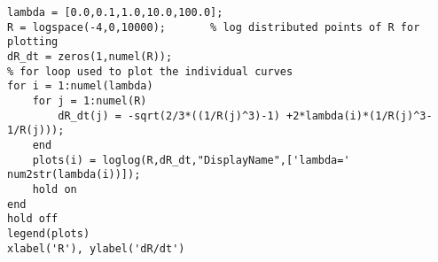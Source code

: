 \lstset{basicstyle=\footnotesize,style=myCustomMatlabStyle}
\begin{lstlisting}
lambda = [0.0,0.1,1.0,10.0,100.0];     
R = logspace(-4,0,10000);       % log distributed points of R for plotting
dR_dt = zeros(1,numel(R));
% for loop used to plot the individual curves
for i = 1:numel(lambda)
    for j = 1:numel(R)
        dR_dt(j) = -sqrt(2/3*((1/R(j)^3)-1) +2*lambda(i)*(1/R(j)^3-1/R(j)));
    end
    plots(i) = loglog(R,dR_dt,"DisplayName",['lambda=' num2str(lambda(i))]);
    hold on
end
hold off
legend(plots)
xlabel('R'), ylabel('dR/dt')
\end{lstlisting}
